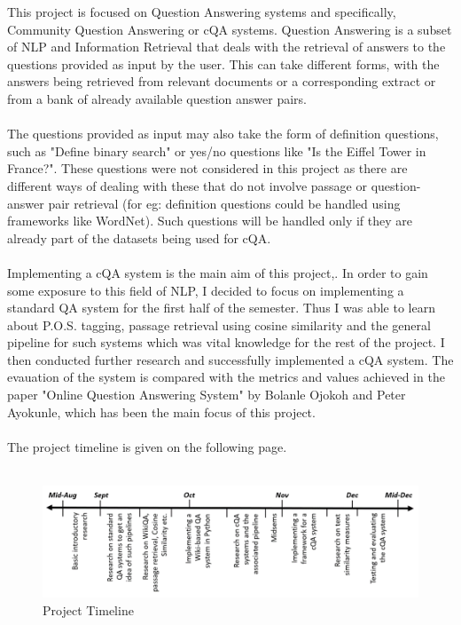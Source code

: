 \documentclass[12pt, a4paper]{article}
\begin{document}
This project is focused on Question Answering systems and specifically, Community Question Answering or cQA systems. Question Answering is a subset of NLP and Information Retrieval that deals with the retrieval of answers to the questions provided as input by the user. This can take different forms, with the answers being retrieved from relevant documents or a corresponding extract or from a bank of already available question answer pairs. 
\\~\\
The questions provided as input may also take the form of definition questions, such as "Define binary search" or yes/no questions like "Is the Eiffel Tower in France?". These questions were not considered in this project as there are different ways of dealing with these that do not involve passage or question-answer pair retrieval (for eg: definition questions could be handled using frameworks like WordNet). Such questions will be handled only if they are already part of the datasets being used for cQA. 
\\~\\
Implementing a cQA system is the main aim of this project,. In order to gain some exposure to this field of NLP, I decided to focus on implementing a standard QA system for the first half of the semester. Thus I was able to learn about P.O.S. tagging, passage retrieval using cosine similarity and the general pipeline for such systems which was vital knowledge for the rest of the project. I then conducted further research and successfully implemented a cQA system. The evauation of the system is compared with the metrics and values achieved in the paper "Online Question Answering System" by Bolanle Ojokoh and Peter Ayokunle, which has been the main focus of this project. 
\\~\\ 
The project timeline is given on the following page.
\\~\\
\begin{figure}[h] 
    \includegraphics[scale=0.6]{timeline.png} 
    \centering 
    \caption{Project Timeline}
    \centering
\end{figure} 
\end{document}
